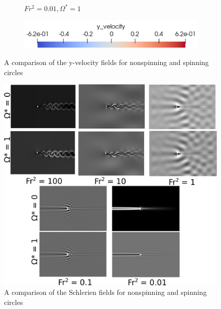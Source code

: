\begin{figure}
\begin{subfigure}[b]{0.32\textwidth}
        \caption{$Fr^2 = 0.01, \Omega^{\ast} = 1$}
        \label{fig:av1frs0p01}
    \end{subfigure}
    
    \begin{subfigure}[b]{0.32\textwidth}
        \centering
        \includegraphics[width=\textwidth]{images/circle/scale.png}
        \caption*{}
    \end{subfigure}
    
    \caption{A comparison of the y-velocity fields for nonspinning and spinning circles}
    \label{fig:circle y-vel}
\end{figure}

\begin{figure}
    \centering
    \includegraphics[width = \textwidth]{images/circle/circleschlerien.png}
    \caption{A comparison of the Schlerien fields for nonspinning and spinning circles}
    \label{fig:circleschlerien}
\end{figure}


